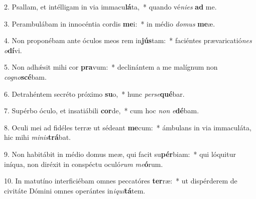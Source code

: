 2. Psallam, et intélligam in via immacu\textbf{lá}ta,~*  quando vé\textit{ni}\textit{es} \textbf{ad} me.\

3. Perambulábam in innocéntia cordis \textbf{me}i:~*  in médio \textit{do}\textit{mus} \textbf{me}æ.\

4. Non proponébam ante óculos meos rem in\textbf{jús}tam:~*  faciéntes prævaricatió\textit{nes} \textit{o}\textbf{dí}vi.\

5. Non adhǽsit mihi cor \textbf{pra}vum:~*  declinántem a me malígnum non \textit{co}\textit{gno}\textbf{scé}bam.\

6. Detrahéntem secréto próximo \textbf{su}o,~*  hunc \textit{per}\textit{se}\textbf{qué}bar.\

7. Supérbo óculo, et insatiábili \textbf{cor}de,~*  cum hoc \textit{non} \textit{e}\textbf{dé}bam.\

8. Oculi mei ad fidéles terræ ut sédeant \textbf{me}cum:~*  ámbulans in via immaculáta, hic mihi \textit{mi}\textit{nis}\textbf{trá}bat.\

9. Non habitábit in médio domus meæ, qui facit su\textbf{pér}biam:~*  qui lóquitur iníqua, non diréxit in conspéctu oculó\textit{rum} \textit{me}\textbf{ó}rum.\

10. In matutíno interficiébam omnes peccatóres \textbf{ter}ræ:~*  ut dispérderem de civitáte Dómini omnes operántes in\textit{i}\textit{qui}\textbf{tá}tem.\

